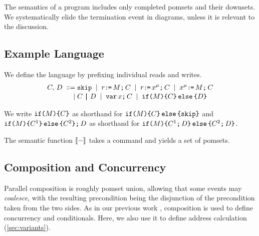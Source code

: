 The semantics of a program includes only completed pomsets and their
downsets.  We systematically elide the termination event in diagrams, unless
it is relevant to the discussion.

\subsection{Example Language}
We define the language by prefixing individual reads and writes.  %
\begin{align*}
  \aCmd,\,\bCmd
  \BNFDEF& \SKIP
  \BNFSEP \aReg\GETS\aExp\SEMI \aCmd
  \BNFSEP \aReg\GETS\aLoc^{\amode}\SEMI \aCmd 
  \BNFSEP \aLoc^{\amode}\GETS\aExp\SEMI \aCmd
  \\[-.5ex]
  \BNFSEP&\aCmd \PAR[\aThrd][\bThrd] \bCmd
  \BNFSEP \VAR\aLoc\SEMI \aCmd
  \BNFSEP \IF{\aExp} \THEN \aCmd \ELSE \bCmd \FI
\end{align*}

We write
$\IF{\aExp} \THEN \aCmd \FI$ as shorthand for
$\IF{\aExp} \THEN \aCmd\ELSE \SKIP\FI$ and
$\IF{\aExp} \THEN \aCmd^1 \ELSE \aCmd^2 \FI \SEMI \bCmd$ as shorthand for
$\IF{\aExp} \THEN \aCmd^1 \SEMI \bCmd\ELSE \aCmd^2 \SEMI \bCmd\FI$.

The semantic function $\sem[\aThrd]{-}$ takes a command and
yields a set of pomsets.

\subsection{Composition and Concurrency}
\label{sec:par}
Parallel composition is roughly pomset union, allowing that some events may
\emph{coalesce}, with the resulting precondition being the disjunction of the
precondition taken from the two sides.  As in our previous work
\cite{2019-sp}, composition is used to define concurrency and conditionals.
Here, we also use it to define address calculation
(\textsection\ref{sec:variants}).  %

